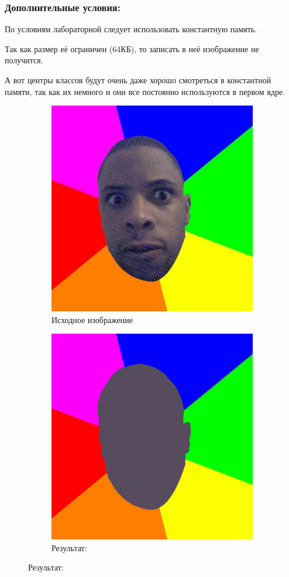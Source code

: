 \documentclass[12pt]{article}
\begin{document}
\subsubsection*{Дополнительные условия:}

По условиям лабораторной следует использовать константную память.

Так как размер её ограничен (64КБ), то записать в неё изображение не получится.

А вот центры классов будут очень даже хорошо смотреться в константной памяти,
так как их немного и они все постоянно используются в первом ядре.

{
}


\begin{figure}[!tbh]
	\caption*{Малое изображение: 400x408}
	\begin{subfigure}{0.49\textwidth}
		\centering
		\caption*{Исходное изображение}
		\includegraphics[scale=0.4]{../test/images/nigger.png}
	\end{subfigure}
	\begin{subfigure}{0.49\textwidth}
		\centering
		\caption*{Результат:}
		\includegraphics[scale=0.4]{t3-res.png}

\end{subfigure}
\end{figure}
\end{document}
